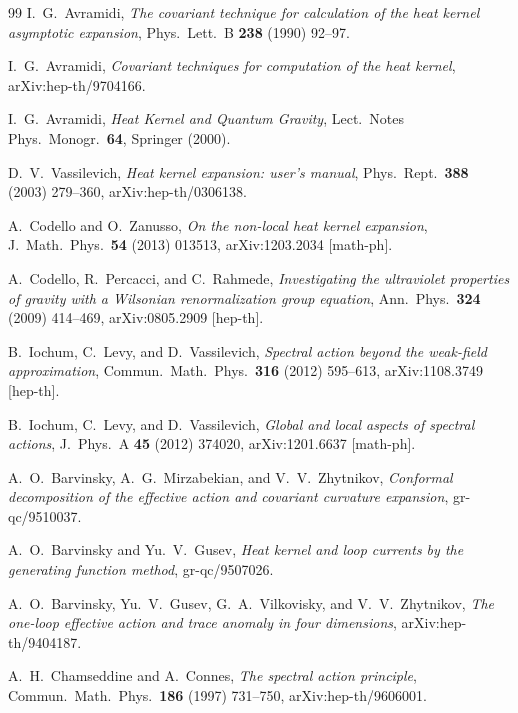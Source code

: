 \documentclass[12pt,a4paper]{article}
\theoremstyle{definition}
\theoremstyle{remark}
\begin{document}
\begin{thebibliography}{99}
  I.~G.~Avramidi,
  \emph{The covariant technique for calculation of the heat kernel
  asymptotic expansion},
  Phys.\ Lett.\ B \textbf{238} (1990) 92--97.

  I.~G.~Avramidi,
  \emph{Covariant techniques for computation of the heat kernel},
  arXiv:hep-th/9704166.

  I.~G.~Avramidi,
  \emph{Heat Kernel and Quantum Gravity},
  Lect.\ Notes Phys.\ Monogr.\ \textbf{64}, Springer (2000).

  D.~V.~Vassilevich,
  \emph{Heat kernel expansion: user's manual},
  Phys.\ Rept.\ \textbf{388} (2003) 279--360,
  arXiv:hep-th/0306138.

  A.~Codello and O.~Zanusso,
  \emph{On the non-local heat kernel expansion},
  J.\ Math.\ Phys.\ \textbf{54} (2013) 013513,
  arXiv:1203.2034 [math-ph].

  A.~Codello, R.~Percacci, and C.~Rahmede,
  \emph{Investigating the ultraviolet properties of gravity with a
  Wilsonian renormalization group equation},
  Ann.\ Phys.\ \textbf{324} (2009) 414--469,
  arXiv:0805.2909 [hep-th].

  B.~Iochum, C.~Levy, and D.~Vassilevich,
  \emph{Spectral action beyond the weak-field approximation},
  Commun.\ Math.\ Phys.\ \textbf{316} (2012) 595--613,
  arXiv:1108.3749 [hep-th].

  B.~Iochum, C.~Levy, and D.~Vassilevich,
  \emph{Global and local aspects of spectral actions},
  J.\ Phys.\ A \textbf{45} (2012) 374020,
  arXiv:1201.6637 [math-ph].

  A.~O.~Barvinsky, A.~G.~Mirzabekian, and V.~V.~Zhytnikov,
  \emph{Conformal decomposition of the effective action and covariant
  curvature expansion},
  gr-qc/9510037.

  A.~O.~Barvinsky and Yu.~V.~Gusev,
  \emph{Heat kernel and loop currents by the generating function method},
  gr-qc/9507026.

  A.~O.~Barvinsky, Yu.~V.~Gusev, G.~A.~Vilkovisky, and
  V.~V.~Zhytnikov,
  \emph{The one-loop effective action and trace anomaly in four
  dimensions},
  arXiv:hep-th/9404187.

  A.~H.~Chamseddine and A.~Connes,
  \emph{The spectral action principle},
  Commun.\ Math.\ Phys.\ \textbf{186} (1997) 731--750,
  arXiv:hep-th/9606001.

\end{thebibliography}
\end{document}

